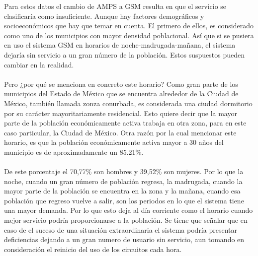 \documentclass[11pt,letterpaper]{article}
\begin{document}
Para estos datos el cambio de AMPS a GSM resulta en que el servicio se clasificaría como 
insuficiente. Aunque hay factores demográficos y socioeconómicos que hay que temar en 
cuenta. El primero de ellos, es considerado como uno de los municipios con mayor densidad 
poblacional. Así que si se pusiera en uso el sistema GSM en horarios de noche-madrugada-mañana, 
el sistema dejaría sin servicio a un gran número de la población. Estos suspuestos pueden cambiar 
en la realidad. 
\\ \\
Pero ¿por qué se menciona 
en concreto este horario? Como gran parte de los municipios del Estado de México que se 
encuentra alrededor de la Ciudad de México, también llamada zonza conurbada, es considerada 
una ciudad dormitorio por su carácter mayoritariamente residencial. Esto quiere decir que 
la mayor parte de la población económicamente activa trabaja en otra zona, para en este caso 
particular, la Ciudad de México. Otra razón por la cual mencionar este horario, es que la 
población económicamente activa mayor a 30 años del municipio es de aproximadamente un 85.21\%. 
\\ \\
De este porcentaje el 70,77\% son hombres y 39,52\% son mujeres. Por lo que la noche, cuando 
un gran número de población regresa, la madrugada, cuando la mayor parte de la población se 
encuentra en la zona y la mañana, cuando esa población que regreso vuelve a salir, son los 
periodos en lo que el sistema tiene una mayor demanda. Por lo que esto deja al día corriente 
como el horario cuando mejor servicio podría proporcionarse a la población. Se tiene que 
señalar que en caso de el suceso de una situación extraordinaria el sistema podría presentar 
deficiencias dejando a un gran numero de usuario sin servicio, aun tomando en consideración 
el reinicio del uso de los circuitos cada hora.
\end{document}
